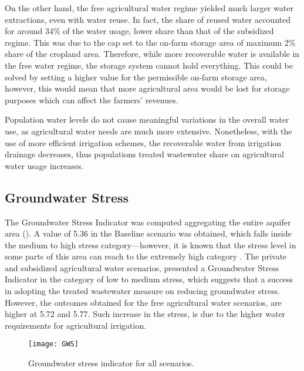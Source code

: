 On the other hand, the free agricultural water regime yielded much larger water extractions, even with water reuse. In fact, the share of reused water accounted for around 34\% of the water usage, lower share than that of the subsidized regime. This was due to the cap set to the on-farm storage area of maximum 2\% share of the cropland area. Therefore, while more recoverable water is available in the free water regime, the storage system cannot hold everything. This could be solved by setting a higher value for the permissible on-farm storage area, however, this would mean that more agricultural area would be lost for storage purposes which can affect the farmers' revenues.

Population water levels do not cause meaningful variations in the overall water use, as agricultural water needs are much more extensive. Nonetheless, with the use of more efficient irrigation schemes, the recoverable water from irrigation drainage decreases, thus populations treated wastewater share on agricultural water usage increases.

\subsection{Groundwater Stress}
The Groundwater Stress Indicator was computed aggregating the entire aquifer area (). A value of 5.36 in the Baseline scenario was obtained, which falls inside the medium to high stress category---however, it is known that the stress level in some parts of this area can reach to the extremely high category \cite{herbertGlobalAssessmentCurrent2019}. The private and subsidized agricultural water scenarios, presented a Groundwater Stress Indicator in the category of low to medium stress, which suggests that a success in adopting the treated wastewater measure on reducing groundwater stress. However, the outcomes obtained for the free agricultural water scenarios, are higher at 5.72 and 5.77. Such increase in the stress, is due to the higher water requirements for agricultural irrigation.

\begin{figure}[!h]
	\centering
	\texttt{[image: GWS]}
	\caption{Groundwater stress indicator for all scenarios.}
	\label{fig:gws}
\end{figure}

